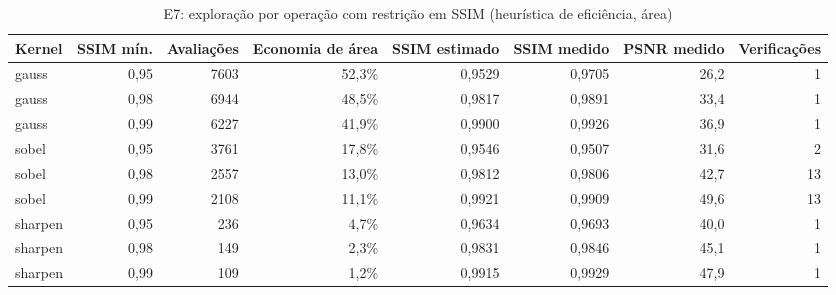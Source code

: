 \begin{table}[htbp]
\centering
\caption{E7: exploração por operação com restrição em SSIM (heurística de eficiência, área)}
\begin{tabular}{|l|r|r|r|r|r|r|r|}
\hline
\rowcolor{tabAzul}\color{white}Kernel & \color{white}SSIM mín. & \color{white}Avaliações & \color{white}Economia de área & \color{white}SSIM estimado & \color{white}SSIM medido & \color{white}PSNR medido & \color{white}Verificações \\
\hline
gauss & 0,95 & 7603 & 52,3\% & 0,9529 & 0,9705 & 26,2 & 1 \\ \hline
gauss & 0,98 & 6944 & 48,5\% & 0,9817 & 0,9891 & 33,4 & 1 \\ \hline
gauss & 0,99 & 6227 & 41,9\% & 0,9900 & 0,9926 & 36,9 & 1 \\ \hline
sobel & 0,95 & 3761 & 17,8\% & 0,9546 & 0,9507 & 31,6 & 2 \\ \hline
sobel & 0,98 & 2557 & 13,0\% & 0,9812 & 0,9806 & 42,7 & 13 \\ \hline
sobel & 0,99 & 2108 & 11,1\% & 0,9921 & 0,9909 & 49,6 & 13 \\ \hline
sharpen & 0,95 & 236 & 4,7\% & 0,9634 & 0,9693 & 40,0 & 1 \\ \hline
sharpen & 0,98 & 149 & 2,3\% & 0,9831 & 0,9846 & 45,1 & 1 \\ \hline
sharpen & 0,99 & 109 & 1,2\% & 0,9915 & 0,9929 & 47,9 & 1 \\ \hline
\end{tabular}
\end{table}
